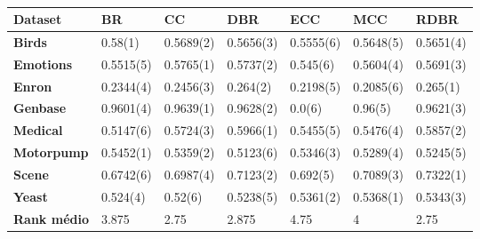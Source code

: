 \begin{table}[h]
\begin{tabular}{lllllll}
\hline
\textbf{Dataset}    & \textbf{BR} & \textbf{CC} & \textbf{DBR} & \textbf{ECC} & \textbf{MCC} & \textbf{RDBR} \\ \hline
\textbf{Birds}      & 0.58(1)     & 0.5689(2)   & 0.5656(3)    & 0.5555(6)    & 0.5648(5)    & 0.5651(4)     \\
\textbf{Emotions}   & 0.5515(5)   & 0.5765(1)   & 0.5737(2)    & 0.545(6)     & 0.5604(4)    & 0.5691(3)     \\
\textbf{Enron}      & 0.2344(4)   & 0.2456(3)   & 0.264(2)     & 0.2198(5)    & 0.2085(6)    & 0.265(1)      \\
\textbf{Genbase}    & 0.9601(4)   & 0.9639(1)   & 0.9628(2)    & 0.0(6)       & 0.96(5)      & 0.9621(3)     \\
\textbf{Medical}    & 0.5147(6)   & 0.5724(3)   & 0.5966(1)    & 0.5455(5)    & 0.5476(4)    & 0.5857(2)     \\
\textbf{Motorpump}  & 0.5452(1)   & 0.5359(2)   & 0.5123(6)    & 0.5346(3)    & 0.5289(4)    & 0.5245(5)     \\
\textbf{Scene}      & 0.6742(6)   & 0.6987(4)   & 0.7123(2)    & 0.692(5)     & 0.7089(3)    & 0.7322(1)     \\
\textbf{Yeast}      & 0.524(4)    & 0.52(6)     & 0.5238(5)    & 0.5361(2)    & 0.5368(1)    & 0.5343(3)     \\ \hline
\textbf{Rank médio} & 3.875       & 2.75        & 2.875        & 4.75         & 4            & 2.75          \\ \hline
\end{tabular}
\caption{}
\label{tab:EBAknn}
\end{table}